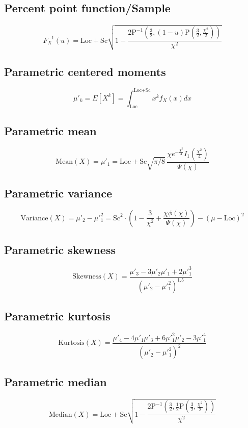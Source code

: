 \documentclass{article}
\begin{document}
\subsection{Percent point function/Sample}
\begin{equation*} F^{-1}_{X}\left(u\right)=\text{Loc}+\text{Sc}\sqrt{1-\frac{2\text{P}^{-1}(\frac{3}{2},(1-u)\text{P}(\frac{3}{2},\frac{\chi^{2}}{2}))}{\chi^{2}}} \end{equation*}
\subsection{Parametric centered moments}
\begin{equation*} \mu'_{k}=E[X^k]=\int_{\text{Loc}}^{\text{Loc}+\text{Sc}}x^{k}f_{X}\left(x\right)dx \end{equation*}
\subsection{Parametric mean}
\begin{equation*} \mathrm{Mean}(X)=\mu'_{1}=\text{Loc}+\text{Sc}\sqrt{\pi/8}\,\frac{\chi e^{-\frac{\chi^2}{4}} I_1(\tfrac{\chi^2}{4})}{\Psi(\chi)} \end{equation*}
\subsection{Parametric variance}
\begin{equation*} \mathrm{Variance}(X)=\mu'_{2}-\mu'^{2}_{1}=\text{Sc}^2\cdot\left(1-\frac{3}{\chi^2}+\frac{\chi\phi(\chi)}{\Psi(\chi)}\right)-(\mu-\text{Loc})^2 \end{equation*}
\subsection{Parametric skewness}
\begin{equation*} \mathrm{Skewness}(X)=\frac{\mu'_{3}-3\mu'_{2}\mu'_{1}+2\mu'^{3}_{1}}{(\mu'_{2}-\mu'^{2}_{1})^{1.5}} \end{equation*}
\subsection{Parametric kurtosis}
\begin{equation*} \mathrm{Kurtosis}(X)=\frac{\mu'_{4}-4\mu'_{1}\mu'_{3}+6\mu'^{2}_{1}\mu'_{2}-3\mu'^{4}_{1}}{(\mu'_{2}-\mu'^{2}_{1})^{2}} \end{equation*}
\subsection{Parametric median}
\begin{equation*} \mathrm{Median}(X)=\text{Loc}+\text{Sc}\sqrt{1-\frac{2\text{P}^{-1}(\frac{3}{2},\frac{1}{2}\text{P}(\frac{3}{2},\frac{\chi^{2}}{2}))}{\chi^{2}}} \end{equation*}
\end{document}
